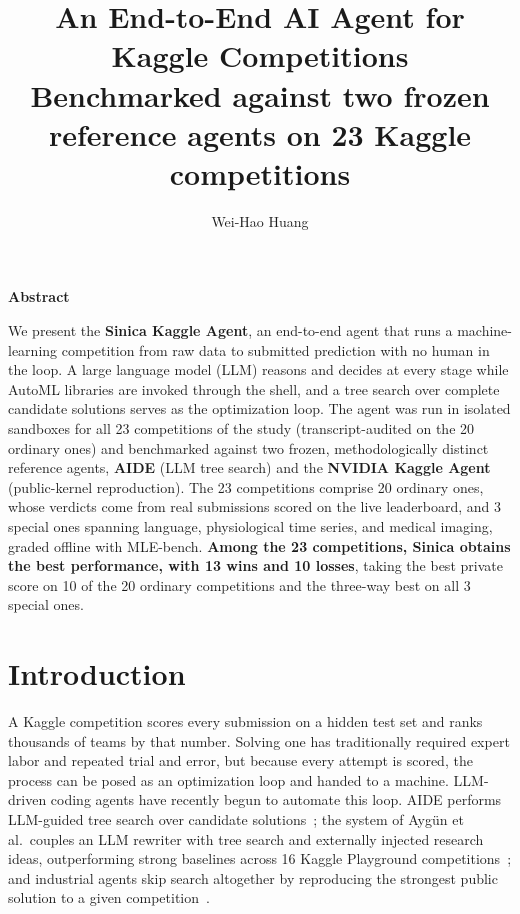 \documentclass[11pt,a4paper]{article}
\title{\textbf{An End-to-End AI Agent for Kaggle Competitions}\\
\large Benchmarked against two frozen reference agents on 23 Kaggle competitions}
\author{Wei-Hao Huang}
\date{}
\begin{document}
\maketitle

\begin{center}\textbf{\large Abstract}\end{center}
\noindent We present the \textbf{Sinica Kaggle Agent}, an end-to-end agent that runs a machine-learning competition from raw data to submitted prediction with no human in the loop. A large language model (LLM) reasons and decides at every stage while AutoML libraries are invoked through the shell, and a tree search over complete candidate solutions serves as the optimization loop. The agent was run in isolated sandboxes for all 23 competitions of the study (transcript-audited on the 20 ordinary ones) and benchmarked against two frozen, methodologically distinct reference agents, \textbf{AIDE} (LLM tree search) and the \textbf{NVIDIA Kaggle Agent} (public-kernel reproduction). The 23 competitions comprise 20 ordinary ones, whose verdicts come from real submissions scored on the live leaderboard, and 3 special ones spanning language, physiological time series, and medical imaging, graded offline with MLE-bench. \textbf{Among the 23 competitions, Sinica obtains the best performance, with 13 wins and 10 losses}, taking the best private score on 10 of the 20 ordinary competitions and the three-way best on all 3 special ones.

\vspace{0.5em}

\section{Introduction}

A Kaggle competition scores every submission on a hidden test set and ranks thousands of teams by that number. Solving one has traditionally required expert labor and repeated trial and error, but because every attempt is scored, the process can be posed as an optimization loop and handed to a machine. LLM-driven coding agents have recently begun to automate this loop. AIDE performs LLM-guided tree search over candidate solutions~\cite{aide2025}; the system of Ayg\"un et al.\ couples an LLM rewriter with tree search and externally injected research ideas, outperforming strong baselines across 16 Kaggle Playground competitions~\cite{aygun2026}; and industrial agents skip search altogether by reproducing the strongest public solution to a given competition~\cite{nvidia2026}.
\end{document}
